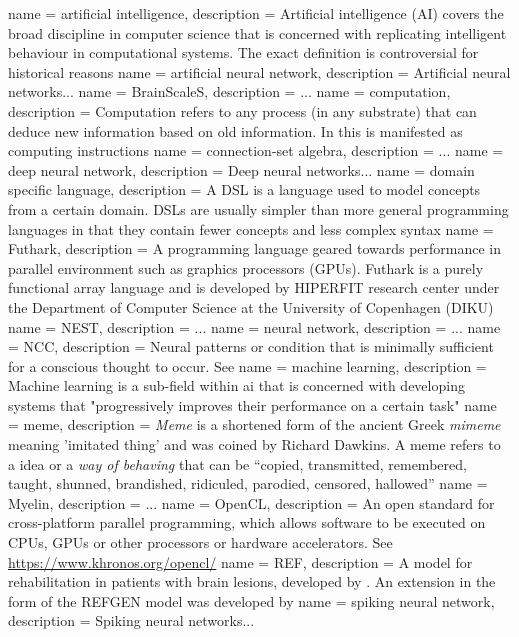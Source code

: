  {
    name = artificial intelligence,
    description = {Artificial intelligence (AI) covers the broad discipline in computer science
that is concerned with replicating intelligent behaviour in computational systems. The exact
definition is controversial for historical reasons \autocite{Nilsson2009}}
}
 {
  name = artificial neural network,
  description = {Artificial neural networks...}
}
 {
  name = BrainScaleS,
  description = {...}
}
 {
   name = computation,
   description = {Computation refers to any process (in any
substrate) that can deduce new information based on old information. In
this is manifested as computing instructions}
}
 {
  name = {connection-set algebra},
  description = {...}
}
 {
  name = {deep neural network},
  description = {Deep neural networks...}
}
 {
  name = domain specific language,
  description = {A DSL is a language used to model concepts from a certain
    domain. DSLs are usually simpler than more general programming languages in
    that they contain fewer concepts and less complex syntax}
}
 {
   name = {Futhark},
   description = {A programming language geared towards performance in parallel environment such as
   graphics processors (GPUs). Futhark is a purely functional array language and is
   developed by HIPERFIT research center under the Department of Computer Science at the
   University of Copenhagen (DIKU)}
}
 {
  name = NEST,
  description = {...}
}
 {
  name = {neural network},
  description = {...} %
}
 {
   name = {NCC},
   description = {Neural patterns or condition that is minimally sufficient for a conscious
thought to occur. See \autocite{atkinson2000, Hohwy2009}}
}
 {
  name = machine learning,
  description = {Machine learning is a sub-field within \gls{ai} that is concerned
    with developing systems that "progressively improves their performance on a
    certain task" \autocite{wiki:ml}}
}
 {
name = meme,
description = {\textit{Meme} is a shortened form of the ancient Greek \textit{mimeme} meaning
'imitated thing' and was coined by Richard Dawkins. A meme refers to a idea or a
\textit{way of behaving} that can be \enquote{copied, transmitted, remembered, taught, shunned,
brandished, ridiculed, parodied, censored, hallowed} \autocite{dennett2017}}
}
 {
  name = Myelin,
  description = {...}
}
 {
   name = {OpenCL},
   description = {An open standard for cross-platform parallel programming, which
   allows software to be executed on CPUs, GPUs or other processors or hardware accelerators. See \url{
   https://www.khronos.org/opencl/}}
}
 {
  name = REF,
  description = {A model for rehabilitation in patients with brain lesions, developed
    by \cite{Mogensen2011}. An extension in the form of the REFGEN model was developed by
    \cite{Mogensen2017}}
}
 {
  name = {spiking neural network},
  description = {Spiking neural networks...}
}
